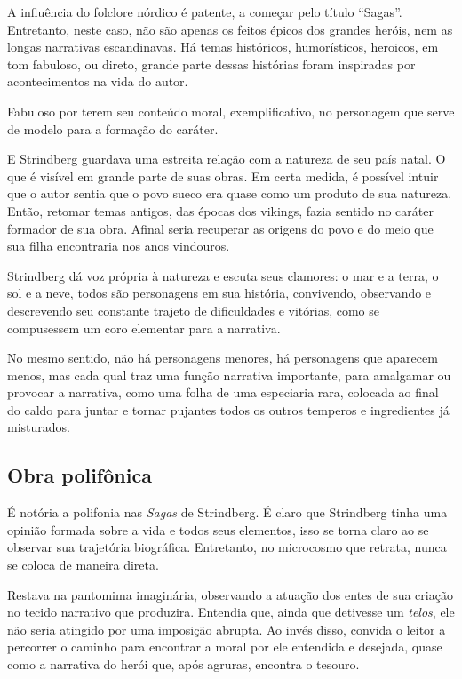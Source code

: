 \documentclass[12pt]{extarticle}
\begin{document}
A influência do folclore nórdico é patente, a começar pelo título ``Sagas''.
Entretanto, neste caso, não são apenas os feitos épicos dos grandes
heróis, nem as longas narrativas escandinavas. Há temas históricos,
humorísticos, heroicos, em tom fabuloso, ou direto, grande parte dessas
histórias foram inspiradas por acontecimentos na vida do autor.

Fabuloso por terem seu conteúdo moral, exemplificativo, no personagem
que serve de modelo para a formação do caráter.

E Strindberg guardava uma estreita relação com a natureza de seu país
natal. O que é visível em grande parte de suas obras. Em certa medida, é
possível intuir que o autor sentia que o povo sueco era quase como um
produto de sua natureza. Então, retomar temas antigos, das épocas dos
vikings, fazia sentido no caráter formador de sua obra. Afinal seria
recuperar as origens do povo e do meio que sua filha encontraria nos
anos vindouros.




Strindberg dá voz própria à natureza e escuta seus clamores: o mar e a
terra, o sol e a neve, todos são personagens em sua história,
convivendo, observando e descrevendo seu constante trajeto de
dificuldades e vitórias, como se compusessem um coro elementar para a
narrativa.

No mesmo sentido, não há personagens menores, há personagens que
aparecem menos, mas cada qual traz uma função narrativa importante, para
amalgamar ou provocar a narrativa, como uma folha de uma especiaria
rara, colocada ao final do caldo para juntar e tornar pujantes todos os
outros temperos e ingredientes já misturados.

\subsection{Obra polifônica}

É notória a polifonia nas \emph{Sagas} de Strindberg. É claro que Strindberg
tinha uma opinião formada sobre a vida e todos seus elementos, isso se
torna claro ao se observar sua trajetória biográfica. Entretanto, no
microcosmo que retrata, nunca se coloca de maneira direta.

Restava na pantomima imaginária, observando a atuação dos entes de sua
criação no tecido narrativo que produzira. Entendia que, ainda que
detivesse um \emph{telos}, ele não seria atingido por uma imposição
abrupta. Ao invés disso, convida o leitor a percorrer o caminho para
encontrar a moral por ele entendida e desejada, quase como a narrativa
do herói que, após agruras, encontra o tesouro.
\end{document}
